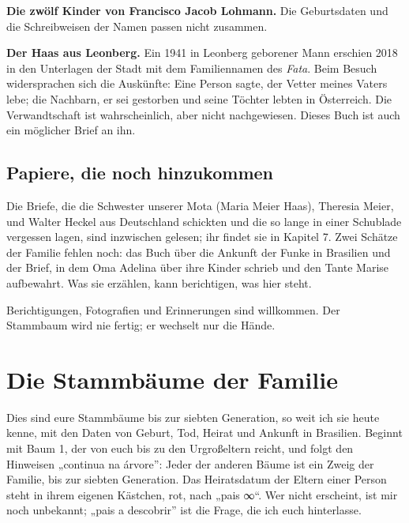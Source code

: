 \documentclass[
  ngerman,
  11pt,
  openany]{book}
\begin{document}
\textbf{Die zwölf Kinder von Francisco Jacob Lohmann.} Die Geburtsdaten
und die Schreibweisen der Namen passen nicht zusammen.

\textbf{Der Haas aus Leonberg.} Ein 1941 in Leonberg geborener Mann
erschien 2018 in den Unterlagen der Stadt mit dem Familiennamen des
\emph{Fata}. Beim Besuch widersprachen sich die Auskünfte: Eine Person
sagte, der Vetter meines Vaters lebe; die Nachbarn, er sei gestorben und
seine Töchter lebten in Österreich. Die Verwandtschaft ist
wahrscheinlich, aber nicht nachgewiesen. Dieses Buch ist auch ein
möglicher Brief an ihn.

\section{Papiere, die noch
hinzukommen}\label{papiere-die-noch-hinzukommen}

Die Briefe, die die Schwester unserer Mota (Maria Meier Haas), Theresia
Meier, und Walter Heckel aus Deutschland schickten und die so lange in
einer Schublade vergessen lagen, sind inzwischen gelesen; ihr findet sie
in Kapitel 7. Zwei Schätze der Familie fehlen noch: das Buch über die
Ankunft der Funke in Brasilien und der Brief, in dem Oma Adelina über
ihre Kinder schrieb und den Tante Marise aufbewahrt. Was sie erzählen,
kann berichtigen, was hier steht.

Berichtigungen, Fotografien und Erinnerungen sind willkommen. Der
Stammbaum wird nie fertig; er wechselt nur die Hände.

\chapter*{Die Stammbäume der Familie}\label{arvores}

Dies sind eure Stammbäume bis zur siebten Generation, so weit ich sie
heute kenne, mit den Daten von Geburt, Tod, Heirat und Ankunft in
Brasilien. Beginnt mit Baum 1, der von euch bis zu den Urgroßeltern
reicht, und folgt den Hinweisen „continua na árvore'': Jeder der anderen
Bäume ist ein Zweig der Familie, bis zur siebten Generation. Das
Heiratsdatum der Eltern einer Person steht in ihrem eigenen Kästchen,
rot, nach „pais ∞``. Wer nicht erscheint, ist mir noch unbekannt; „pais
a descobrir'' ist die Frage, die ich euch hinterlasse.
\end{document}
